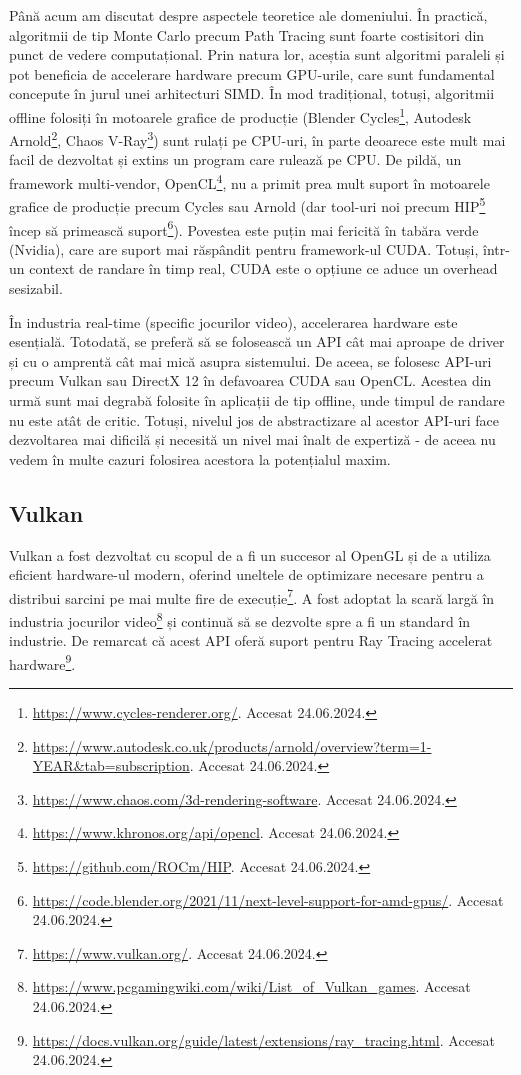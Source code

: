 \documentclass[12pt,a4paper]{report}
\numberwithin{equation}{section} %
\begin{document}
Până acum am discutat despre aspectele teoretice ale domeniului. În practică,
algoritmii de tip Monte Carlo precum Path Tracing sunt foarte costisitori din
punct de vedere computațional. Prin natura lor, aceștia sunt algoritmi paraleli
și pot beneficia de accelerare hardware precum GPU-urile, care sunt fundamental
concepute în jurul unei arhitecturi SIMD. În mod tradițional, totuși, algoritmii
offline folosiți în motoarele grafice de producție (Blender Cycles\footnote{\url{https://www.cycles-renderer.org/}. Accesat 24.06.2024.},
Autodesk Arnold\footnote{\url{https://www.autodesk.co.uk/products/arnold/overview?term=1-YEAR&tab=subscription}. Accesat 24.06.2024.},
Chaos V-Ray\footnote{\url{https://www.chaos.com/3d-rendering-software}. Accesat 24.06.2024.})
sunt rulați pe CPU-uri, în parte deoarece este
mult mai facil de dezvoltat și extins un program care rulează pe CPU. De pildă,
un framework multi-vendor, OpenCL\footnote{\url{https://www.khronos.org/api/opencl}. Accesat 24.06.2024.},
nu a primit prea mult suport în motoarele grafice de producție precum Cycles sau Arnold
(dar tool-uri noi precum HIP\footnote{\url{https://github.com/ROCm/HIP}. Accesat 24.06.2024.}
încep să primească suport\footnote{\url{https://code.blender.org/2021/11/next-level-support-for-amd-gpus/}. Accesat 24.06.2024.}).
Povestea este puțin mai
fericită în tabăra verde (Nvidia), care are suport mai răspândit pentru framework-ul
CUDA. Totuși, într-un context de randare în timp real, CUDA este o opțiune ce
aduce un overhead sesizabil.

În industria real-time (specific jocurilor video), accelerarea hardware este
esențială. Totodată, se preferă să se folosească un API cât mai aproape de driver
și cu o amprentă cât mai mică asupra sistemului. De aceea, se folosesc API-uri
precum Vulkan sau DirectX 12 în defavoarea CUDA sau OpenCL. Acestea din urmă sunt
mai degrabă folosite în aplicații de tip offline, unde timpul de randare nu este
atât de critic. Totuși, nivelul jos de abstractizare al acestor API-uri face
dezvoltarea mai dificilă și necesită un nivel mai înalt de expertiză - de aceea
nu vedem în multe cazuri folosirea acestora la potențialul maxim.

\subsection{Vulkan}

Vulkan a fost dezvoltat cu scopul de a fi un succesor al OpenGL și de a utiliza
eficient hardware-ul modern, oferind uneltele de optimizare necesare
pentru a distribui sarcini pe mai multe fire de execuție\footnote{\url{https://www.vulkan.org/}. Accesat 24.06.2024.}.
A fost adoptat la scară largă în industria jocurilor video\footnote{\url{https://www.pcgamingwiki.com/wiki/List_of_Vulkan_games}. Accesat 24.06.2024.}
și continuă să se dezvolte spre a fi un standard în industrie.
De remarcat că acest API oferă suport pentru Ray Tracing accelerat hardware\footnote{\url{https://docs.vulkan.org/guide/latest/extensions/ray_tracing.html}. Accesat 24.06.2024.}.
\end{document}
